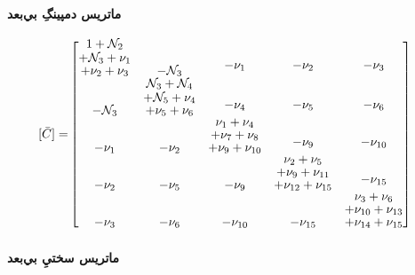 \paragraph{ماتريس دمپينگِ بي‌بعد}

\begin{equation}\label{Eq.damping_matrix_dimensionless}
\begin{aligned}
[\bar{C}] =& 
\begin{bmatrix}
\shortstack{$1 + \mathcal{N}_2$ \\ $+ \mathcal{N}_3 + \nu_1$ \\ $+ \nu_2 + \nu_3$} & -\mathcal{N}_3 & \shortstack{$-\nu_1$ \\ \,} & \shortstack{$-\nu_2$ \\ \,} & \shortstack{$-\nu_3$ \\ \,} \\
-\mathcal{N}_3 & \shortstack{$\mathcal{N}_3 + \mathcal{N}_4$ \\ $+ \mathcal{N}_5 + \nu_4$ \\ $+ \nu_5 + \nu_6$} & \shortstack{$-\nu_4$ \\ \,} & \shortstack{$-\nu_5$ \\ \,} & \shortstack{$-\nu_6$ \\ \,} \\
-\nu_1 & -\nu_2 & \shortstack{$\nu_1 + \nu_4$ \\ $+ \nu_7 + \nu_8$ \\ $+ \nu_9 + \nu_{10}$} & \shortstack{$-\nu_9$ \\ \,} & \shortstack{$-\nu_{10}$ \\ \,} \\
-\nu_2 & -\nu_5 & -\nu_9 & \shortstack{$\nu_2 + \nu_5$ \\ $+ \nu_9 + \nu_{11}$ \\ $+ \nu_{12} + \nu_{15}$} & \shortstack{$-\nu_{15}$ \\ \,} \\
-\nu_3 & -\nu_{6} & -\nu_{10} & -\nu_{15} & \shortstack{$\nu_3 + \nu_6$ \\ $+ \nu_{10} + \nu_{13}$ \\ $+ \nu_{14} + \nu_{15}$}
\end{bmatrix}
\end{aligned}
\end{equation}

\paragraph{ماتريس سختيِ بي‌بعد}

